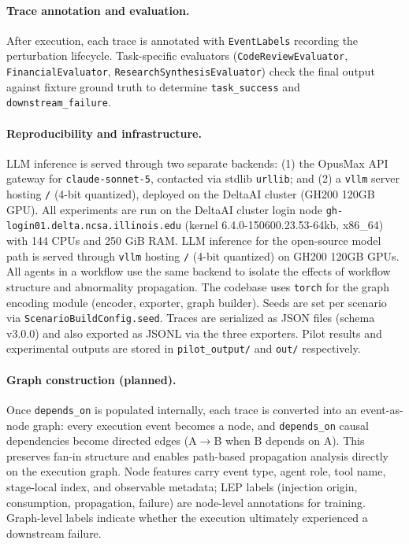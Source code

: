 \paragraph{Trace annotation and evaluation.}
After execution, each trace is annotated with \texttt{EventLabels} recording the perturbation lifecycle. Task-specific evaluators (\texttt{CodeReviewEvaluator}, \texttt{FinancialEvaluator}, \texttt{ResearchSynthesisEvaluator}) check the final output against fixture ground truth to determine \texttt{task\_success} and \texttt{downstream\_failure}.

\paragraph{Reproducibility and infrastructure.}
LLM inference is served through two separate backends: (1) the OpusMax API gateway for \texttt{claude-sonnet-5}, contacted via stdlib \texttt{urllib}; and (2) a \texttt{vllm} server hosting \texttt{/} (4-bit quantized), deployed on the DeltaAI cluster (GH200 120GB GPU). All experiments are run on the DeltaAI cluster login node \texttt{gh-login01.delta.ncsa.illinois.edu} (kernel 6.4.0-150600.23.53-64kb, x86\_64) with 144 CPUs and 250 GiB RAM. LLM inference for the open-source model path is served through \texttt{vllm} hosting \texttt{/} (4-bit quantized) on GH200 120GB GPUs. All agents in a workflow use the same backend to isolate the effects of workflow structure and abnormality propagation. The codebase uses \texttt{torch} for the graph encoding module (encoder, exporter, graph builder). Seeds are set per scenario via \texttt{ScenarioBuildConfig.seed}. Traces are serialized as JSON files (schema v3.0.0) and also exported as JSONL via the three exporters. Pilot results and experimental outputs are stored in \texttt{pilot\_output/} and \texttt{out/} respectively.

\paragraph{Graph construction (planned).}
Once \texttt{depends\_on} is populated internally, each trace is converted into an event-as-node graph: every execution event becomes a node, and \texttt{depends\_on} causal dependencies become directed edges (A$\to$B when B depends on A). This preserves fan-in structure and enables path-based propagation analysis directly on the execution graph. Node features carry event type, agent role, tool name, stage-local index, and observable metadata; LEP labels (injection origin, consumption, propagation, failure) are node-level annotations for training. Graph-level labels indicate whether the execution ultimately experienced a downstream failure.


\nocite{*}
